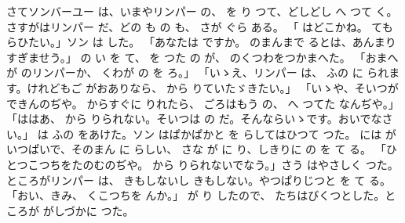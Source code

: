\documentclass[a4paper,
tate,
book]
{jlreq}
\begin{document}
  さてソンバーユー は、いまやリンパー の、 を り つて、どしどし へ つて く。さすがはリンパー だ、どの も の も、 さが ぐら ある。
「 はどこかね。 てもらひたい。」ソン は  した。
「あなたは  ですか。 のまんまで るとは、あんまり すぎませう。」 の い を て、 を つた の が、 のくつわをつかまへた。
「おまへが のリンパーか、 くわが の を ろ。」
「いゝえ、リンパー は、 ふの に られます。けれどもご がおありなら、 から りていたゞきたい。」
「いゝや、そいつができんのぢや。 からすぐに りれたら、 ごろはもう の、 へ つてた なんぢや。」
「ははあ、 から りられない。そいつは の だ。そんならいゝです。おいでなさい。」
   は ふの をあけた。ソン はぱかぱかと を らしてはひつて つた。 には がいつぱいで、そのまん に らしい、 さな が に り、しきりに の を て る。
「ひとつこつちをたのむのぢや。 から りられないでなう。」さう はやさしく つた。ところがリンパー は、 きもしないし きもしない。やつぱりじつと を て る。
「おい、きみ、 くこつちを んか。」 が り したので、 たちはびくつとした。ところが がしづかに つた。
\end{document}
